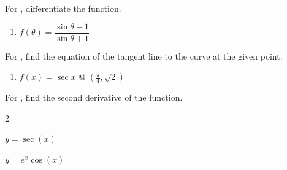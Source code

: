 \documentclass{book}
\newcommand{\dydx}{\dfrac{dy}{dx}}
\newcommand{\ddydxdx}{\dfrac{d^2y}{dx^2}}
\begin{document}
For , differentiate the function.
\begin{enumerate}[!HW!]
\begin{multicols}{3}
\itemspade $y = 7x^2\cos x\cot x$ %
\itemspade $y=\dfrac{6-\sec x}{\tan x}$ %
\itemspade $y=\dfrac{4x}{7-\cot x}$ %
\end{multicols}
\item \label{exer:trigdiff:stop} $f(\theta) = \dfrac{\sin\theta-1}{\sin\theta+1}$ %
\end{enumerate}

For , find the equation of the tangent line to the curve at the given point.
\begin{enumerate}[!HW!]
\item\label{exer:trigtangent:stop} $f(x) = \sec x$ @ $\left(\frac{\pi}{4}, \sqrt{2}\right)$ %
\end{enumerate}

For , find the second derivative of the function.
\begin{enumerate}[!HW!]
\begin{multicols}{2}
\item \label{exer:secondtrig:start} $y = \sec(x)$ %
\item \label{exer:secondtrig:stop}   $y=e^x\cos(x)$ %
\end{multicols}
\end{enumerate}
\end{document}
